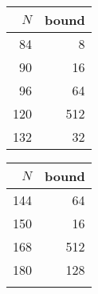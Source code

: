 \begin{table}%
    \label{tab:rank_zero_bound}
    \centering
    \begin{tabular}{rr}
        \toprule
        $N$ & bound \\
        \midrule
        84 & 8 \\
        90 & 16 \\
        96 & 64 \\
        120 & 512 \\
        132 & 32 \\
        \bottomrule
    \end{tabular}
    \begin{tabular}{rr}
        \toprule
        $N$ & bound \\
        \midrule
        144 & 64 \\
        150 & 16 \\
        168 & 512 \\
        180 & 128  \\
            &  \\
        \bottomrule
    \end{tabular}
\end{table}

